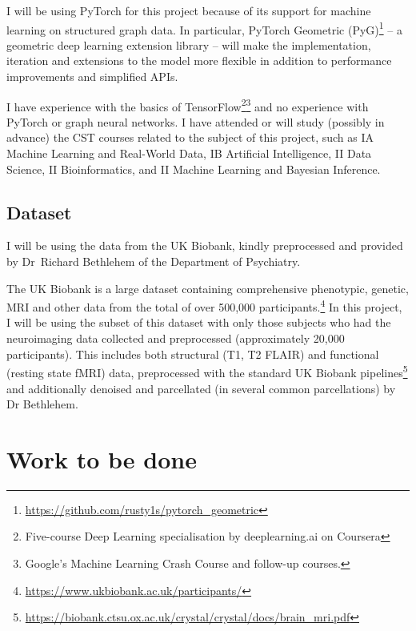 \documentclass[12pt,a4paper,twoside, hidelinks]{article}
\begin{document}
I will be using PyTorch for this project because of its support for machine learning on structured graph data. In particular, PyTorch Geometric (PyG)\footnote{\url{https://github.com/rusty1s/pytorch_geometric}} – a geometric deep learning extension library – will make the implementation, iteration and extensions to the model more flexible in addition to performance improvements and simplified APIs.

I have experience with the basics of TensorFlow\footnote{Five-course Deep Learning specialisation by deeplearning.ai on Coursera}\footnote{Google's Machine Learning Crash Course and follow-up courses.} and no experience with PyTorch or graph neural networks. I have attended or will study (possibly in advance) the CST courses related to the subject of this project, such as IA Machine Learning and Real-World Data, IB Artificial Intelligence, II Data Science, II Bioinformatics, and II Machine Learning and Bayesian Inference.

\subsection*{Dataset}

I will be using the data from the UK Biobank, kindly preprocessed and provided by Dr~Richard Bethlehem of the Department of Psychiatry.

The UK Biobank is a large dataset containing comprehensive phenotypic, genetic, MRI and other data from the total of over 500,000 participants.\footnote{\url{https://www.ukbiobank.ac.uk/participants/}} In this project, I will be using the subset of this dataset with only those subjects who had the neuroimaging data collected and preprocessed (approximately 20,000 participants). This includes both structural (T1, T2 FLAIR) and functional (resting state fMRI) data, preprocessed with the standard UK Biobank pipelines\footnote{\url{https://biobank.ctsu.ox.ac.uk/crystal/crystal/docs/brain_mri.pdf}} and additionally denoised and parcellated (in several common parcellations) by Dr Bethlehem. 

\section*{Work to be done}
\label{section:work}
\end{document}
